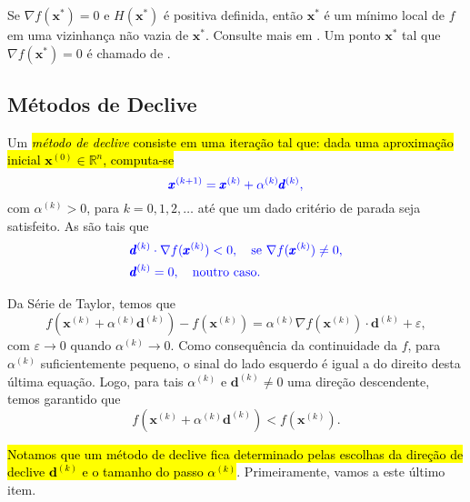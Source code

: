 \begin{obs}
  Se $\nabla f(\pmb{x}^*) = 0$ e $H(\pmb{x}^*)$ é positiva definida, então $\pmb{x}^*$ é um mínimo local de $f$ em uma vizinhança não vazia de $\pmb{x}^*$. Consulte mais em \cite[Seção 7.2]{Quarteroni2007a}. Um ponto $\pmb{x}^*$ tal que $\nabla f(\pmb{x}^*) = 0$ é chamado de .
\end{obs}

\subsection{Métodos de Declive}
\badgeRevisar

Um \hl{\emph{método de declive} consiste em uma iteração tal que: dada uma aproximação inicial $\pmb{x}^{(0)}\in\mathbb{R}^n$, computa-se}
\begin{equation}\color{blue}\pmb{x}^{(k+1)} = \pmb{x}^{(k)} + \alpha^{(k)} \pmb{d}^{(k)},
\end{equation}
com  $\alpha^{(k)}>0$, para $k=0,1,2,\ldots$ até que um dado critério de parada seja satisfeito. As  são tais que
\begin{align}
  &\color{blue}\pmb{d}^{(k)}\cdot\nabla f(\pmb{x}^{(k)}) < 0,\quad \text{se } \nabla f(\pmb{x}^{(k)}) \neq 0,\label{eq:condDirecoes0}\\
  &\color{blue}\pmb{d}^{(k)} = 0,\quad \text{noutro caso.}\label{eq:condDirecoes1}
\end{align}

\begin{obs}
  Da Série de Taylor{\taylor}, temos que
  \begin{equation}
    f(\pmb{x}^{(k)}+\alpha^{(k)}\pmb{d}^{(k)}) - f(\pmb{x}^{(k)}) = \alpha^{(k)}\nabla f(\pmb{x}^{(k)})\cdot \pmb{d}^{(k)} + \varepsilon,
  \end{equation}
  com $\varepsilon\to 0$ quando $\alpha^{(k)}\to 0$. Como consequência da continuidade da $f$, para $\alpha^{(k)}$ suficientemente pequeno, o sinal do lado esquerdo é igual a do direito desta última equação. Logo, para tais $\alpha^{(k)}$ e $\pmb{d}^{(k)}\neq 0$ uma direção descendente, temos garantido que
  \begin{equation}
    f(\pmb{x}^{(k)}+\alpha^{(k)}\pmb{d}^{(k)}) < f(\pmb{x}^{(k)}).
  \end{equation}
\end{obs}


\hl{Notamos que um método de declive fica determinado pelas escolhas da direção de declive $\pmb{d}^{(k)}$ e o tamanho do passo $\alpha^{(k)}$}. Primeiramente, vamos a este último item.

